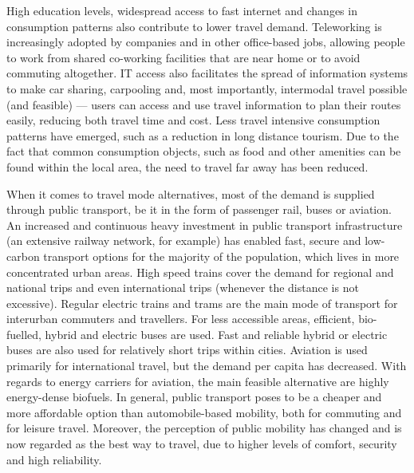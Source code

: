 {High education levels, widespread access to fast internet and changes in consumption patterns also contribute to lower travel demand. Teleworking is increasingly adopted by companies and in other office-based jobs, allowing people to work from shared co-working facilities that are near home or to avoid commuting altogether. IT access also facilitates the spread of information systems to make car sharing, carpooling and, most importantly, intermodal travel possible (and feasible) --- users can access and use travel information to plan their routes easily, reducing both travel time and cost. Less travel intensive consumption patterns have emerged, such as a reduction in long distance tourism. Due to the fact that common consumption objects, such as food and other amenities can be found within the local area, the need to travel far away has been reduced.

When it comes to travel mode alternatives, most of the demand is supplied through public transport, be it in the form of passenger rail, buses or aviation. An increased and continuous heavy investment in public transport infrastructure (an extensive railway network, for example) has enabled fast, secure and low-carbon transport options for the majority of the population, which lives in more concentrated urban areas. High speed trains cover the demand for regional and national trips and even international trips (whenever the distance is not excessive). Regular electric trains and trams are the main mode of transport for interurban commuters and travellers. For less accessible areas, efficient, bio-fuelled, hybrid and electric buses are used. Fast and reliable hybrid or electric buses are also used for relatively short trips within cities. Aviation is used primarily for international travel, but the demand per capita has decreased. With regards to energy carriers for aviation, the main feasible alternative are highly energy-dense biofuels. In general, public transport poses to be a cheaper and more affordable option than automobile-based mobility, both for commuting and for leisure travel. Moreover, the perception of public mobility has changed and is now regarded as the best way to travel, due to higher levels of comfort, security and high reliability.

}
